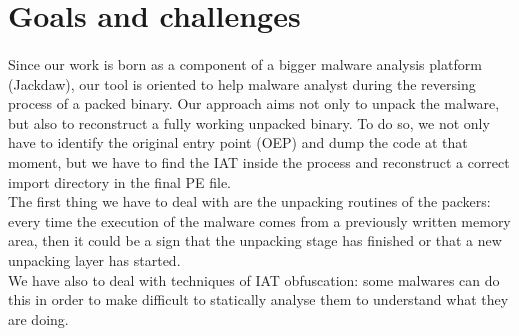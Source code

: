 \section{Goals and challenges}
\paragraph{}
Since our work is born as a component of a bigger malware analysis platform (Jackdaw), our tool is oriented to help malware analyst during the reversing process of a packed binary. 
Our approach aims not only to unpack the malware, but also to reconstruct a fully working unpacked binary. To do so, we not only have to identify the original entry point (OEP) and dump the code at that moment, but we have to find the IAT inside the process and reconstruct a correct import directory in the final PE file.\\
The first thing we have to deal with are the unpacking routines of the packers: every time the execution of the malware comes from a previously written memory area, then it could be a sign that the unpacking stage has finished or that a new unpacking layer has started.\\
We have also to deal with techniques of IAT obfuscation: some malwares can do this in order to make difficult to statically analyse them to understand what they are doing.

